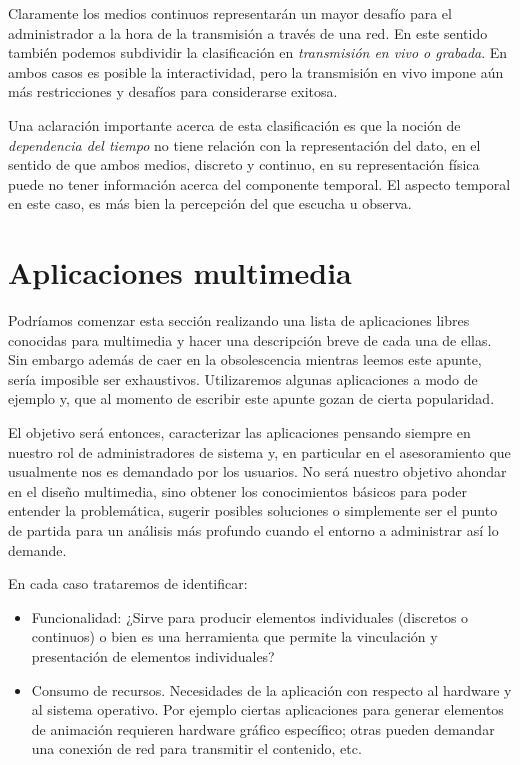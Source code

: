 \documentclass[12pt]{article}
\begin{document}
Claramente los medios continuos representarán un mayor desafío para el 
administrador a la hora de la transmisión a través de una red. En este 
sentido también podemos subdividir la clasificación en {\it transmisión
en vivo o grabada}. En ambos casos es posible la interactividad, pero 
la transmisión en vivo impone aún más restricciones y desafíos para 
considerarse exitosa. 

Una aclaración importante acerca de esta clasificación es que la noción 
de {\it dependencia del tiempo} no tiene relación con la representación
del dato, en el sentido de que ambos medios, discreto y continuo, en su 
representación física puede no tener información acerca del componente 
temporal. El aspecto temporal en este caso, es más bien la percepción del 
que escucha u observa.\cite{ramyer}  

\section*{Aplicaciones multimedia}

Podríamos comenzar esta sección realizando una lista de aplicaciones 
libres conocidas para multimedia y hacer una descripción breve de cada
una de ellas. Sin embargo además de caer en la obsolescencia mientras 
leemos este apunte, sería imposible ser exhaustivos. Utilizaremos 
algunas aplicaciones a modo de ejemplo y, que al momento de escribir este 
apunte gozan de cierta popularidad.  

El objetivo será entonces, caracterizar las aplicaciones pensando
siempre en nuestro rol de administradores de sistema y, en particular 
en el asesoramiento que usualmente nos es demandado por los usuarios. No
será nuestro objetivo ahondar en el diseño multimedia, sino obtener 
los conocimientos básicos para poder entender la problemática, sugerir 
posibles soluciones o simplemente ser el punto de partida para un análisis 
más profundo cuando el entorno a administrar así lo demande. 

En cada caso trataremos de identificar: 
\begin{itemize}
\item Funcionalidad: ¿Sirve para producir elementos individuales (discretos o continuos) o 
bien es una herramienta que permite la vinculación y presentación de elementos individuales? 
\item Consumo de recursos. Necesidades de la aplicación con respecto al 
hardware y al sistema operativo. Por ejemplo ciertas aplicaciones para generar 
elementos de animación requieren hardware gráfico específico; otras pueden demandar 
una conexión de red para transmitir el contenido, etc. 
\end{itemize}
\end{document}
